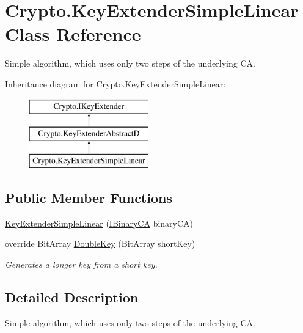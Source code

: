 \hypertarget{class_crypto_1_1_key_extender_simple_linear}{}\section{Crypto.\+Key\+Extender\+Simple\+Linear Class Reference}
\label{class_crypto_1_1_key_extender_simple_linear}


Simple algorithm, which uses only two steps of the underlying C\+A.  


Inheritance diagram for Crypto.\+Key\+Extender\+Simple\+Linear\+:\begin{figure}[H]
\begin{center}
\leavevmode
\includegraphics[height=3.000000cm]{class_crypto_1_1_key_extender_simple_linear}
\end{center}
\end{figure}
\subsection*{Public Member Functions}
\begin{DoxyCompactItemize}
\item 
\hyperlink{class_crypto_1_1_key_extender_simple_linear_a318ebefc5ef25570e751b21c071fba06}{Key\+Extender\+Simple\+Linear} (\hyperlink{interface_cellular_1_1_i_binary_c_a}{I\+Binary\+C\+A} binary\+C\+A)
\item 
override Bit\+Array \hyperlink{class_crypto_1_1_key_extender_simple_linear_a1b511ea8a0e0bb6cbd4f6a94f49015bd}{Double\+Key} (Bit\+Array short\+Key)
\begin{DoxyCompactList}\small\item\em Generates a longer key from a short key. \end{DoxyCompactList}\end{DoxyCompactItemize}


\subsection{Detailed Description}
Simple algorithm, which uses only two steps of the underlying C\+A. 



